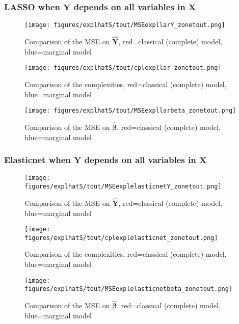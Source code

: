 \documentclass[12pt,a4paper]{report}
\begin{document}
\subsubsection{LASSO when $\boldsymbol{Y}$ depends on all variables in $\boldsymbol{X}$}

	\begin{figure}[h!]
	\centering
		  \texttt{[image: figures/explhatS/tout/MSEexpllarY\_zonetout.png]}
		\caption{Comparison of the MSE on $\hat{\boldsymbol{Y}}$, red=classical (complete) model, blue=marginal model}\label{MSEexpllarY_zonetout}
	\end{figure}
	\begin{figure}[h!]
	\centering
		  \texttt{[image: figures/explhatS/tout/cplexpllar\_zonetout.png]}
		\caption{Comparison of the complexities, red=classical (complete) model, blue=marginal model}\label{cplexpllar_zonetout}
	\end{figure}
	\begin{figure}[h!]
	\centering
		  \texttt{[image: figures/explhatS/tout/MSEexpllarbeta\_zonetout.png]}
		\caption{Comparison of the MSE on $\hat{\boldsymbol{\beta}}$, red=classical (complete) model, blue=marginal model}\label{MSEexpllarbeta_zonetout}
	\end{figure}
	\FloatBarrier
\newpage
\subsubsection{Elasticnet when $\boldsymbol{Y}$ depends on all variables in $\boldsymbol{X}$}

	\begin{figure}[h!]
	\centering
		  \texttt{[image: figures/explhatS/tout/MSEexplelasticnetY\_zonetout.png]}
		\caption{Comparison of the MSE on $\hat{\boldsymbol{Y}}$, red=classical (complete) model, blue=marginal model}\label{MSEexplelasticnetY_zonetout}
	\end{figure}
	\begin{figure}[h!]
	\centering
		  \texttt{[image: figures/explhatS/tout/cplexplelasticnet\_zonetout.png]}
		\caption{Comparison of the complexities, red=classical (complete) model, blue=marginal model}\label{cplexplelasticnet_zonetout}
	\end{figure}
	\begin{figure}[h!]
	\centering
		  \texttt{[image: figures/explhatS/tout/MSEexplelasticnetbeta\_zonetout.png]}
		\caption{Comparison of the MSE on $\hat{\boldsymbol{\beta}}$, red=classical (complete) model, blue=marginal model}\label{MSEexplelasticnetbeta_zonetout}
	\end{figure}
	\FloatBarrier
\newpage
\end{document}
